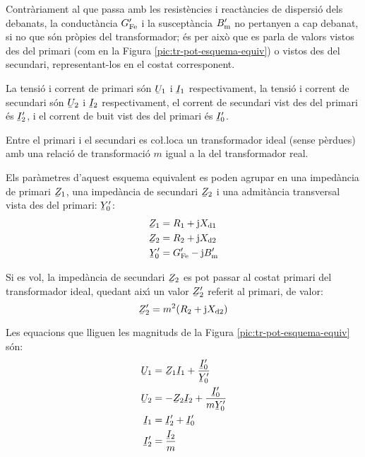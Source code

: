 Contr\`{a}riament al que passa amb les resist\`{e}ncies i react\`{a}ncies de dispersi\'{o} dels debanats, la conduct\`{a}ncia $G_\mathrm{Fe}'$ i la suscept\`{a}ncia $B_\mathrm{m}'$ no pertanyen a cap debanat, si no que s\'{o}n pr\`{o}pies del transformador; \'{e}s per aix\`{o} que es parla de valors vistos des del primari (com en la Figura \vref{pic:tr-pot-esquema-equiv}) o vistos des del secundari, representant-los en el costat corresponent.

La tensi\'{o} i corrent de primari s\'{o}n $\cmplx{U}_1$ i $\cmplx{I}_1$ respectivament, la tensi\'{o} i corrent de secundari s\'{o}n $\cmplx{U}_2$ i $\cmplx{I}_2$ respectivament, el corrent de secundari vist des del primari \'{e}s $\cmplx{I}_2'$, i el corrent de buit vist des del primari \'{e}s $\cmplx{I}_0'$.

Entre el primari i el secundari es co{\l.l}oca un transformador ideal (sense p\`{e}rdues) amb una relaci\'{o} de transformaci\'{o} $m$ igual a la del transformador real.

Els par\`{a}metres d'aquest esquema equivalent es poden agrupar en una imped\`{a}ncia de primari $\cmplx{Z}_1$, una imped\`{a}ncia de secundari $\cmplx{Z}_2$ i una  admit\`{a}ncia transversal vista des del primari: $\cmplx{Y}_0'$:
\begin{align}
    \cmplx{Z}_1 &= R_1 + \ju X\ped{d1} \\
    \cmplx{Z}_2 &= R_2 + \ju X\ped{d2}\\
    \cmplx{Y}_0' &= G\ped{Fe}'- \ju B\ped{m}'
\end{align}

Si es vol, la imped\`{a}ncia de secundari $\cmplx{Z}_2$ es pot passar al costat primari del transformador ideal, quedant aix\'{\i} un valor $\cmplx{Z}_2'$ referit al primari, de valor:
\begin{equation}
    \cmplx{Z}_2' = m^2 (R_2 + \ju X\ped{d2})
\end{equation}

Les equacions que lliguen les magnituds de la Figura \vref{pic:tr-pot-esquema-equiv} s\'{o}n:
\begin{align}
    \cmplx{U}_1  &=   \cmplx{Z}_1 \cmplx{I}_1 + \frac{\cmplx{I}_0'}{\cmplx{Y}_0'} \\
    \cmplx{U}_2  &= - \cmplx{Z}_2 \cmplx{I}_2 + \frac{\cmplx{I}_0'}{m \cmplx{Y}_0' }\\
    \cmplx{I}_1  &=   \cmplx{I}_2' + \cmplx{I}_0'\\
    \cmplx{I}_2' &=   \frac{\cmplx{I}_2}{m}
\end{align}


